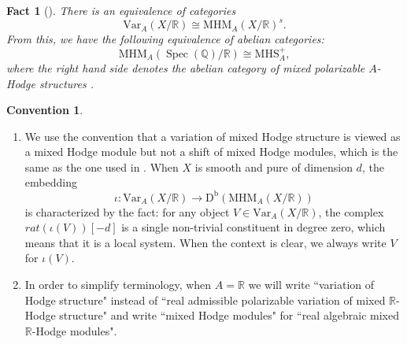 \documentclass[11pt, a4paper]{amsart}
\theoremstyle{plain}
\newtheorem{fact}[theorem]{Fact}
\theoremstyle{definition}
\newtheorem{convention}[theorem]{Convention}
\numberwithin{equation}{section}
\def\QQ{\mathbb{Q}}
\def\RR{\mathbb{R}}
\DeclareMathOperator{\Spec}{Spec}
\begin{document}
\begin{fact}[{\cite[Definition A.2.4.b]{HW98}}] 
    There is an equivalence of categories
    \[
        \mathrm{Var}_{A}(X/\RR) \cong \mathrm{MHM}_{A}(X/\RR)^{s}.  
    \]
    From this, we have the following equivalence of abelian categories:
    \[
        \mathrm{MHM}_{A}(\Spec(\QQ)/\RR) \cong \mathrm{MHS}_{A}^{+},
    \]
    where the right hand side denotes the abelian category of mixed polarizable $A$-Hodge structures \textnormal{\cite[Lemma  A.2.2]{HW98}}. 
\end{fact}

\begin{convention}
    \begin{enumerate}
        \item 
            We use the convention that a variation of mixed Hodge structure is viewed as a mixed Hodge module but not a shift of mixed Hodge modules, which is the same as the one used in \cite{Bow04}. When $X$ is smooth and pure of dimension $d$, the embedding 
            \begin{equation*}
                \iota \colon \mathrm{Var}_{A}(X/\RR) \rightarrow \mathrm{D}^{\mathrm{b}}(\mathrm{MHM}_{A}(X/\RR))
            \end{equation*}
            is characterized by the fact: for any object $V \in \mathrm{Var}_{A}(X/\RR)$, the complex $rat(\iota(V))[-d]$ is a single non-trivial constituent in degree zero,  which means that it is a local system. When the context is clear, we always write $V$ for $\iota(V)$. 
        \item In order to simplify terminology, when $A = \RR$ we will write ``variation of Hodge structure" instead of ``real admissible polarizable variation of mixed $\RR$-Hodge structure" and write ``mixed Hodge modules" for ``real algebraic mixed $\RR$-Hodge modules". 
    \end{enumerate}
\end{convention}
\end{document}
